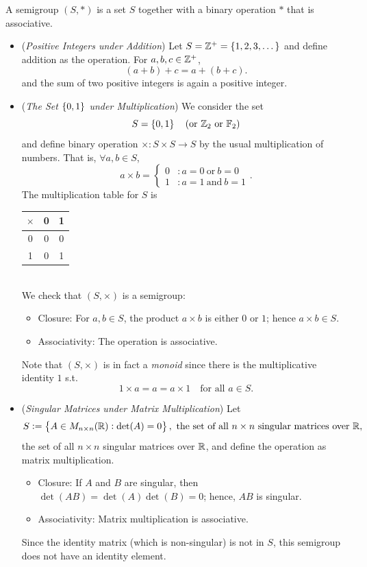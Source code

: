 \documentclass[11pt,openany]{article}
\begin{document}
\begin{example}
A semigroup $(S,*)$ is a set $S$ together with a binary operation $*$ that is associative. \begin{itemize}
	\item (\emph{Positive Integers under Addition}) Let $S=\mathbb{Z}^+=\set{1,2,3,\dots}$ and define addition as the operation. For $a,b,c\in\mathbb{Z}^+$, \[
	(a+b)+c=a+(b+c).
	\] and the sum of two positive integers is again a positive integer.
	\vspace{20pt}
	\item (\textit{The Set $\set{0,1}$ under Multiplication}) We consider the set \[
	S=\set{0,1}\quad(\text{or}\ \Z_2\ \text{or}\ \F_2)
	\] and define binary operation $\times:S\times S\to S$ by the usual multiplication of numbers. That is, $\forall a,b\in S$, \[
	a\times b=\begin{cases}
		0 &:a=0\ \text{or}\ b=0\\
		1 &:a=1\ \text{and}\ b=1
	\end{cases}.
	\] The multiplication table for $S$ is \begin{table}[h!]\centering
		\begin{tabular}{c||c|c}
			$\times$ & 0 & 1 \\ \hline\hline
			0 & 0 & 0 \\ \hline
			1 & 0 & 1 \\
		\end{tabular}
	\end{table}\\ We check that $(S,\times)$ is a semigroup: \begin{itemize}
	\item Closure: For $a,b\in S$, the product $a\times b$ is either $0$ or $1$; hence $a\times b\in S$.
	\item Associativity: The operation is associative.
\end{itemize} Note that $(S,\times)$ is in fact a \textit{monoid} since there is the multiplicative identity $1$ s.t. \[
1\times a=a=a\times1\quad\text{for all $a\in S$}.
\]
	\vspace{20pt}
	\item (\emph{Singular Matrices under Matrix Multiplication}) Let \[
	S:=\set{A\in M_{n\times n}(\R):\det(A)=0},\ \text{the set of all $n\times n$ singular matrices over $\R$},
	\] the set of all $n\times n$ singular matrices over $\mathbb{R}$, and define the operation as matrix multiplication.
	\begin{itemize}
		\item Closure: If $A$ and $B$ are singular, then $\det(AB)=\det(A)\det(B)=0$; hence, $AB$ is singular.
		\item Associativity: Matrix multiplication is associative.
	\end{itemize}
	Since the identity matrix (which is non-singular) is not in $S$, this semigroup does not have an identity element.
\end{itemize}
\end{example}
\end{document}

